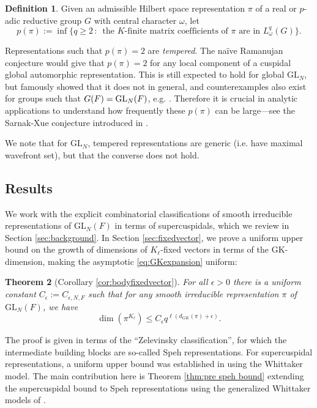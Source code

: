 \documentclass{amsart}
\newcommand{\GL}{\mathrm{GL}}
\newcommand{\eps}{\epsilon}
\newcommand{\om}{\omega}
\newcommand{\1}{\m 1}
\newtheorem{thm}{Theorem}[subsection]
\theoremstyle{remark}
\theoremstyle{definition}
\newtheorem{dfn}[thm]{Definition}
\numberwithin{equation}{subsection}
\begin{document}
\begin{dfn}\label{def:ppi}
Given an admissible Hilbert space representation $\pi$ of a real or $p$-adic reductive group $G$ with central character $\om$, let
\[
p(\pi) := \inf\{q \geq 2 \,:\, \text{ the $K$-finite matrix coefficients of }\pi \text{ are in } L^q_\om(G)\}. 
\]
\end{dfn}


Representations such that $p(\pi) = 2$ are \emph{tempered}. The na\"ive Ramanujan conjecture would give that $p(\pi) = 2$ for any local component of a cuspidal global automorphic representation. This is still expected to hold for global $\GL_N$, but \cite{HPS79} famously showed that it does not in general, and counterexamples also exist for groups such that $G(F) = {\rm GL}_N(F)$, e.g. \cite{Ro90}. Therefore it is crucial in analytic applications to understand how frequently these $p(\pi)$ can be large---see the Sarnak-Xue conjecture introduced in \cite{SX91}. 

We note that for $\GL_N$, tempered representations are generic (i.e. have maximal wavefront set), but that the converse does not hold. 

\subsection{Results}
We work with the explicit combinatorial classifications of smooth irreducible representations of $\GL_N(F)$ in terms of supercuspidals, which we review in Section \ref{sec:background}. In Section \ref{sec:fixedvector}, we prove a uniform upper bound on the growth of dimensions of $K_\ell$-fixed vectors in terms of the GK-dimension, making the asymptotic \eqref{eq:GKexpansion} uniform:
\begin{thm}[Corollary \ref{cor:bodyfixedvector}]\label{thm:mainfixedvector}
For all $\eps > 0$ there is a uniform constant $C_\eps := C_{\eps, N, F}$ such that for any smooth irreducible representation $\pi$ of $\GL_N(F)$, we have
\[
\dim(\pi^{K_\ell}) \leq C_\eps q^{\ell (d_{GK}(\pi) + \eps)}.
\]
\end{thm}
The proof is given in terms of the ``Zelevinsky classification'', for which the intermediate building blocks are so-called Speh representations. For supercuspidal representations, a uniform upper bound was established in \cite[Lem A.1]{MS19} using the Whittaker model. The main contribution here is Theorem \ref{thm:pre speh bound} extending the supercuspidal bound to Speh representations using the generalized Whittaker models of \cite{MW87}. 
\end{document}
